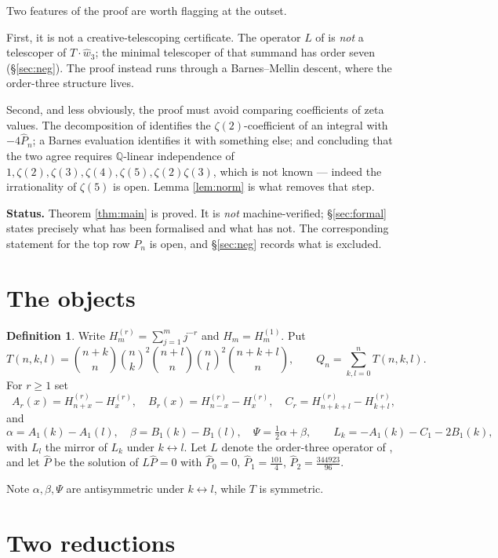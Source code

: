 \documentclass[11pt,a4paper]{amsart}
\theoremstyle{plain}
\theoremstyle{definition}
\newtheorem{definition}[theorem]{Definition}
\theoremstyle{remark}
\newcommand{\QQ}{\mathbb{Q}}
\newcommand{\T}{T}
\begin{document}
Two features of the proof are worth flagging at the outset.

First, it is not a creative-telescoping certificate. The operator $L$ of \cite{BZ} is
\emph{not} a telescoper of $\T\cdot\widehat w_3$; the minimal telescoper of that summand has
order seven (\S\ref{sec:neg}). The proof instead runs through a Barnes--Mellin descent, where the
order-three structure lives.

Second, and less obviously, the proof must avoid comparing coefficients of zeta values. The
decomposition of \cite{BZ} identifies the $\zeta(2)$-coefficient of an integral with
$-4\widehat P_n$; a Barnes evaluation identifies it with something else; and concluding that the
two agree requires $\QQ$-linear independence of $1,\zeta(2),\zeta(3),\zeta(4),\zeta(5),
\zeta(2)\zeta(3)$, which is not known --- indeed the irrationality of $\zeta(5)$ is open.
Lemma \ref{lem:norm} is what removes that step.

\medskip
\noindent\textbf{Status.} Theorem \ref{thm:main} is proved. It is \emph{not} machine-verified;
\S\ref{sec:formal} states precisely what has been formalised and what has not. The
corresponding statement for the top row $P_n$ is open, and \S\ref{sec:neg} records what is
excluded.

\section{The objects}

\begin{definition}\label{def:objects}
Write $H^{(r)}_m=\sum_{j=1}^m j^{-r}$ and $H_m=H^{(1)}_m$. Put
\[
  \T(n,k,l)=\binom{n+k}{n}\binom nk^2\binom{n+l}{n}\binom nl^2\binom{n+k+l}{n},
  \qquad Q_n=\sum_{k,l=0}^{n}\T(n,k,l).
\]
For $r\ge1$ set
\[
  A_r(x)=H^{(r)}_{n+x}-H^{(r)}_x,\quad
  B_r(x)=H^{(r)}_{n-x}-H^{(r)}_x,\quad
  C_r=H^{(r)}_{n+k+l}-H^{(r)}_{k+l},
\]
and
\[
  \alpha=A_1(k)-A_1(l),\quad \beta=B_1(k)-B_1(l),\quad \Psi=\tfrac12\alpha+\beta,
  \qquad L_k=-A_1(k)-C_1-2B_1(k),
\]
with $L_l$ the mirror of $L_k$ under $k\leftrightarrow l$. Let $L$ denote the order-three
operator of \cite{BZ}, and let $\widehat P$ be the solution of $L\widehat P=0$ with
$\widehat P_0=0$, $\widehat P_1=\frac{101}4$, $\widehat P_2=\frac{344923}{96}$.
\end{definition}

Note $\alpha,\beta,\Psi$ are antisymmetric under $k\leftrightarrow l$, while $\T$ is symmetric.

\section{Two reductions}
\end{document}
